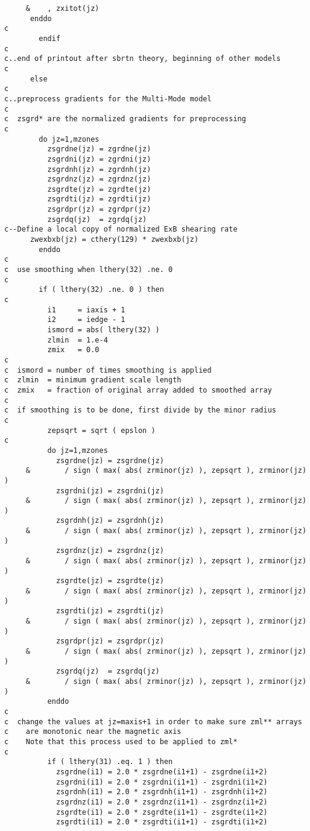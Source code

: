 \begin{verbatim}
     &    , zxitot(jz)
      enddo
c
        endif
c
c..end of printout after sbrtn theory, beginning of other models
c
      else
c
c..preprocess gradients for the Multi-Mode model
c
c  zsgrd* are the normalized gradients for preprocessing
c
        do jz=1,mzones
          zsgrdne(jz) = zgrdne(jz)
          zsgrdni(jz) = zgrdni(jz)
          zsgrdnh(jz) = zgrdnh(jz)
          zsgrdnz(jz) = zgrdnz(jz)
          zsgrdte(jz) = zgrdte(jz)
          zsgrdti(jz) = zgrdti(jz)
          zsgrdpr(jz) = zgrdpr(jz)
          zsgrdq(jz)  = zgrdq(jz)
c--Define a local copy of normalized ExB shearing rate
	  zwexbxb(jz) = cthery(129) * zwexbxb(jz)
        enddo
c
c  use smoothing when lthery(32) .ne. 0
c
        if ( lthery(32) .ne. 0 ) then
c
          i1     = iaxis + 1
          i2     = iedge - 1
          ismord = abs( lthery(32) )
          zlmin  = 1.e-4
          zmix   = 0.0
c
c  ismord = number of times smoothing is applied
c  zlmin  = minimum gradient scale length
c  zmix   = fraction of original array added to smoothed array
c
c  if smoothing is to be done, first divide by the minor radius
c
          zepsqrt = sqrt ( epslon )
c
          do jz=1,mzones
            zsgrdne(jz) = zsgrdne(jz)
     &        / sign ( max( abs( zrminor(jz) ), zepsqrt ), zrminor(jz) )
            zsgrdni(jz) = zsgrdni(jz)
     &        / sign ( max( abs( zrminor(jz) ), zepsqrt ), zrminor(jz) )
            zsgrdnh(jz) = zsgrdnh(jz)
     &        / sign ( max( abs( zrminor(jz) ), zepsqrt ), zrminor(jz) )
            zsgrdnz(jz) = zsgrdnz(jz)
     &        / sign ( max( abs( zrminor(jz) ), zepsqrt ), zrminor(jz) )
            zsgrdte(jz) = zsgrdte(jz)
     &        / sign ( max( abs( zrminor(jz) ), zepsqrt ), zrminor(jz) )
            zsgrdti(jz) = zsgrdti(jz)
     &        / sign ( max( abs( zrminor(jz) ), zepsqrt ), zrminor(jz) )
            zsgrdpr(jz) = zsgrdpr(jz)
     &        / sign ( max( abs( zrminor(jz) ), zepsqrt ), zrminor(jz) )
            zsgrdq(jz)  = zsgrdq(jz)
     &        / sign ( max( abs( zrminor(jz) ), zepsqrt ), zrminor(jz) )
          enddo
c
c  change the values at jz=maxis+1 in order to make sure zml** arrays
c    are monotonic near the magnetic axis
c    Note that this process used to be applied to zml*
c
          if ( lthery(31) .eq. 1 ) then
            zsgrdne(i1) = 2.0 * zsgrdne(i1+1) - zsgrdne(i1+2)
            zsgrdni(i1) = 2.0 * zsgrdni(i1+1) - zsgrdni(i1+2)
            zsgrdnh(i1) = 2.0 * zsgrdnh(i1+1) - zsgrdnh(i1+2)
            zsgrdnz(i1) = 2.0 * zsgrdnz(i1+1) - zsgrdnz(i1+2)
            zsgrdte(i1) = 2.0 * zsgrdte(i1+1) - zsgrdte(i1+2)
            zsgrdti(i1) = 2.0 * zsgrdti(i1+1) - zsgrdti(i1+2)

\end{verbatim}
